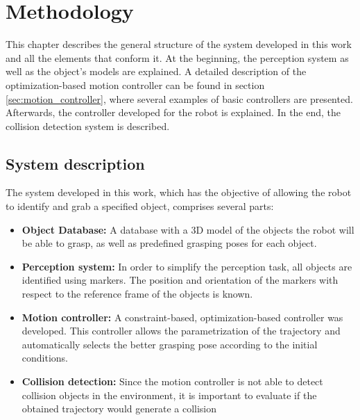 
\chapter{\textbf{Methodology}}

This chapter describes the general structure of the system developed in this work and all the elements that conform it. At the beginning, the perception system as well as the object's models are explained. A detailed description of the optimization-based motion controller can be found in section \ref{sec:motion_controller}, where several examples of basic controllers are presented. Afterwards, the controller developed for the robot is explained. In the end, the collision detection system is described.

\section{System description}
\label{sec:sys_description}

The system developed in this work, which has the objective of allowing the robot to identify and grab a specified object, comprises several parts:

\begin{itemize}
	\item \textbf{Object Database:} A database with a 3D model of the objects the robot will be able to grasp, as well as predefined grasping poses for each object.
	\item \textbf{Perception system:} In order to simplify the perception task, all objects are identified using markers. The position and orientation of the markers with respect to the reference frame of the objects is known.
	\item \textbf{Motion controller:} A constraint-based, optimization-based controller was developed. This controller allows the parametrization of the trajectory and automatically selects the better grasping pose according to the initial conditions.
	\item \textbf{Collision detection:} Since the motion controller is not able to detect collision objects in the environment, it is important to evaluate if the obtained trajectory would generate a collision
\end{itemize} 

